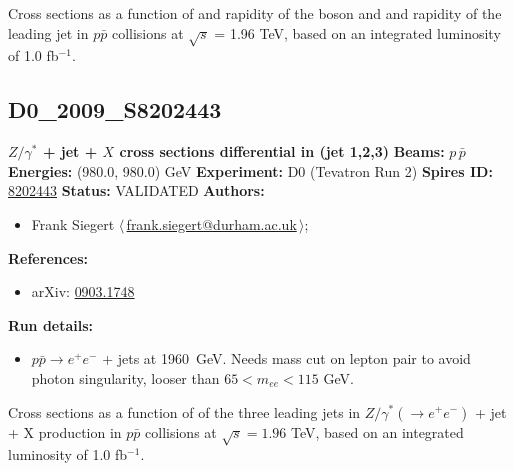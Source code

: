 \noindent Cross sections as a function of \pT and rapidity of the boson and \pT and rapidity of the leading jet in $p \bar{p}$ collisions at $\sqrt{s}$ = 1.96 TeV, based on an integrated luminosity of 1.0 fb$^{-1}$.

\clearpage


\clearpage

\subsection[D0\_2009\_S8202443]{D0\_2009\_S8202443\,\cite{Abazov:2009av}}
\textbf{$Z/\gamma^*$ + jet + $X$ cross sections differential in \pT(jet 1,2,3)}\newline
\textbf{Beams:} $p$\,$\bar{p}$ \newline
\textbf{Energies:} (980.0, 980.0) GeV \newline
\textbf{Experiment:} D0 (Tevatron Run 2) \newline
\textbf{Spires ID:} \href{http://www.slac.stanford.edu/spires/find/hep/www?rawcmd=key+8202443}{8202443}\newline
\textbf{Status:} VALIDATED\newline
\textbf{Authors:}
\begin{itemize}
  \item Frank Siegert $\langle\,$\href{mailto:frank.siegert@durham.ac.uk}{frank.siegert@durham.ac.uk}$\,\rangle$;
\end{itemize}
\textbf{References:}
\begin{itemize}
  \item arXiv: \href{http://arxiv.org/abs/0903.1748}{0903.1748}
\end{itemize}
\textbf{Run details:}
\begin{itemize}

  \item $p \bar{p} \to e^+ e^-$ + jets at 1960~GeV. Needs mass cut on lepton pair to avoid photon singularity, looser than $65 < m_{ee} < 115$ GeV.\end{itemize}

\noindent Cross sections as a function of \pT of the three leading jets in $Z/\gamma^{*} (\to e^{+} e^{-})$ + jet + X production in $p \bar{p}$ collisions at $\sqrt{s} = 1.96$ TeV, based on an integrated luminosity of 1.0 fb$^{-1}$.

\clearpage


\clearpage

